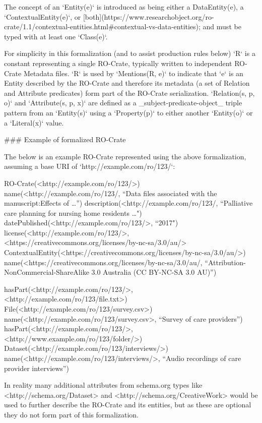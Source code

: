 The concept of an `Entity(e)` is introduced as being either a DataEntity(e), a `ContextualEntity(e)`, or [both](https://www.researchobject.org/ro-crate/1.1/contextual-entities.html#contextual-vs-data-entities); and must be typed with at least one `Class(e)`. 

For simplicity in this formalization (and to assist production rules below) `R` is a constant representing a single RO-Crate, typically written to independent RO-Crate Metadata files. `R` is used by `Mentions(R, e)` to indicate that `e` is an Entity described by the RO-Crate and therefore its metadata (a set of Relation and Attribute predicates) form part of the RO-Crate serialization. `Relation(s, p, o)` and `Attribute(s, p, x)` are defined as a _subject-predicate-object_ triple pattern from an `Entity(s)` using a `Property(p)` to either another `Entity(o)` or a `Literal(x)` value.


### Example of formalized RO-Crate 

The below is an example RO-Crate represented using the above formalization, assuming a base URI of `http://example.com/ro/123/`:

    RO-Crate(<http://example.com/ro/123/>)
    name(<http://example.com/ro/123/, 
        “Data files associated with the manuscript:Effects of …”)
    description(<http://example.com/ro/123/, 
        “Palliative care planning for nursing home residents …")
    datePublished(<http://example.com/ro/123/>, “2017")
    license(<http://example.com/ro/123/>, 
        <https://creativecommons.org/licenses/by-nc-sa/3.0/au/>
    ContextualEntity(<https://creativecommons.org/licenses/by-nc-sa/3.0/au/>)
    name(<https://creativecommons.org/licenses/by-nc-sa/3.0/au/, 
        “Attribution-NonCommercial-ShareAlike 3.0 Australia (CC BY-NC-SA 3.0 AU)”)

    hasPart(<http://example.com/ro/123/>, <http://example.com/ro/123/file.txt>)
    File(<http://example.com/ro/123/survey.csv>)
    name(<http://example.com/ro/123/survey.csv>, “Survey of care providers”)
    hasPart(<http://example.com/ro/123/>, <http://www.example.om/ro/123/folder/>)
    Dataset(<http://example.com/ro/123/interviews/>)
    name(<http://example.com/ro/123/interviews/>, 
        “Audio recordings of care provider interviews”)

In reality many additional attributes from schema.org types like <http://schema.org/Dataset> and <http://schema.org/CreativeWork> would be used to further describe the RO-Crate and its entities, but as these are optional they do not form part of this formalization.


